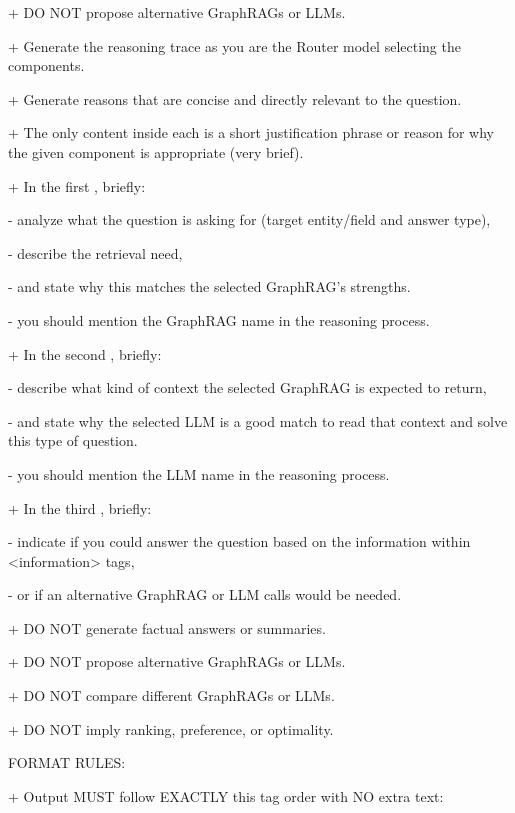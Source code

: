 \begin{tcolorbox}
+ DO NOT propose alternative GraphRAGs or LLMs.\par
+ Generate the reasoning trace as you are the Router model selecting the components.\par
+ Generate reasons that are concise and directly relevant to the question.\par
+ The only content inside each  is a short justification phrase or reason for why the given component is appropriate (very brief).\par
+ In the first , briefly:\par
\quad - analyze what the question is asking for (target entity/field and answer type),\par
\quad - describe the retrieval need,\par
\quad - and state why this matches the selected GraphRAG's strengths.\par
\quad - you should mention the GraphRAG name in the reasoning process.\par
+ In the second , briefly:\par
\quad  - describe what kind of context the selected GraphRAG is expected to return,\par
\quad  - and state why the selected LLM is a good match to read that context and solve this type of question.\par
\quad  - you should mention the LLM name in the reasoning process.\par
+ In the third , briefly:\par
\quad  - indicate if you could answer the question based on the information within <information> tags,\par
\quad  - or if an alternative GraphRAG or LLM calls would be needed.\par
+ DO NOT generate factual answers or summaries. \par
+ DO NOT propose alternative GraphRAGs or LLMs. \par
+ DO NOT compare different GraphRAGs or LLMs. \par
+ DO NOT imply ranking, preference, or optimality. \par

\medskip
FORMAT RULES:\par
+ Output MUST follow EXACTLY this tag order with NO extra text:\par

\end{tcolorbox}



